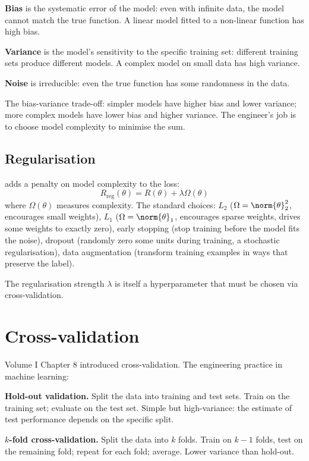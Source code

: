\textbf{Bias} is the systematic error of the model: even with infinite data, the model cannot match the true function. A linear model fitted to a non-linear function has high bias.

\textbf{Variance} is the model's sensitivity to the specific training set: different training sets produce different models. A complex model on small data has high variance.

\textbf{Noise} is irreducible: even the true function has some randomness in the data.

The bias-variance trade-off: simpler models have higher bias and lower variance; more complex models have lower bias and higher variance. The engineer's job is to choose model complexity to minimise the sum.

\subsection{Regularisation}

 adds a penalty on model complexity to the loss:
\[
R_{\text{reg}}(\theta) = R(\theta) + \lambda \Omega(\theta)
\]
where $\Omega(\theta)$ measures complexity. The standard choices: $L_2$ ($\Omega = \norm{\theta}_2^2$, encourages small weights), $L_1$ ($\Omega = \norm{\theta}_1$, encourages sparse weights, drives some weights to exactly zero), early stopping (stop training before the model fits the noise), dropout (randomly zero some units during training, a stochastic regularisation), data augmentation (transform training examples in ways that preserve the label).

The regularisation strength $\lambda$ is itself a hyperparameter that must be chosen via cross-validation.

\section{Cross-validation}

Volume I Chapter 8 introduced cross-validation. The engineering practice in machine learning:

\textbf{Hold-out validation.} Split the data into training and test sets. Train on the training set; evaluate on the test set. Simple but high-variance: the estimate of test performance depends on the specific split.

\textbf{$k$-fold cross-validation.} Split the data into $k$ folds. Train on $k-1$ folds, test on the remaining fold; repeat for each fold; average. Lower variance than hold-out.

